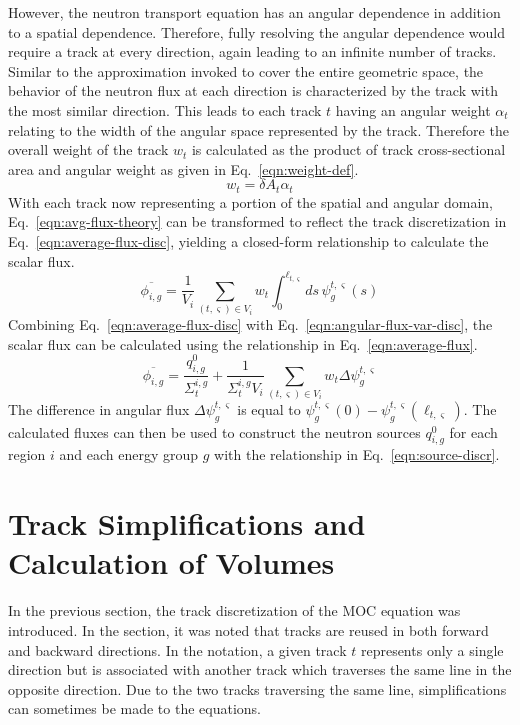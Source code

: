 However, the neutron transport equation has an angular dependence in addition to a spatial dependence. Therefore, fully resolving the angular dependence would require a track at every direction, again leading to an infinite number of tracks. Similar to the approximation invoked to cover the entire geometric space, the behavior of the neutron flux at each direction is characterized by the track with the most similar direction. This leads to each track $t$ having an angular weight $\alpha_t$ relating to the width of the angular space represented by the track. Therefore the overall weight of the track $w_t$ is calculated as the product of track cross-sectional area and angular weight as given in Eq.~\ref{eqn:weight-def}.
\begin{equation}
w_{t} = \delta A_{t} \alpha_t
\label{eqn:weight-def}
\end{equation}
With each track now representing a portion of the spatial and angular domain, Eq.~\ref{eqn:avg-flux-theory} can be transformed to reflect the track discretization in Eq.~\ref{eqn:average-flux-disc}, yielding a closed-form relationship to calculate the scalar flux.
\begin{dmath}
	\overline{\phi_{i,g}} = \frac{1}{V_i} \sum_{(t,\varsigma) \in V_i} w_{t} \int_{0}^{\ell_{t,\varsigma}} ds \, \psi^{t,\varsigma}_g(s)
	\label{eqn:average-flux-disc}
\end{dmath}
Combining Eq.~\ref{eqn:average-flux-disc} with Eq.~\ref{eqn:angular-flux-var-disc}, the scalar flux can be calculated using the relationship in Eq.~\ref{eqn:average-flux}.
\begin{dmath}
	\overline{\phi_{i,g}} = \frac{q^0_{i,g}}{\Sigma_{t}^{i,g}} + \frac{1}{\Sigma_{t}^{i,g} V_i} \sum_{(t,\varsigma) \in V_i} w_{t} \Delta \psi_g^{t,\varsigma}
	\label{eqn:average-flux}
\end{dmath}
The difference in angular flux $\Delta \psi_g^{t,\varsigma}$ is equal to $\psi_g^{t,\varsigma}(0) - \psi_g^{t,\varsigma}(\ell_{t,\varsigma})$. The calculated fluxes can then be used to construct the neutron sources $q^0_{i,g}$ for each region $i$ and each energy group $g$ with the relationship in Eq.~\ref{eqn:source-discr}.

\section{Track Simplifications and Calculation of Volumes}
\label{sec:track-simplifications}

In the previous section, the track discretization of the \ac{MOC} equation was introduced. In the section, it was noted that tracks are reused in both forward and backward directions. In the notation, a given track $t$ represents only a single direction but is associated with another track which traverses the same line in the opposite direction. Due to the two tracks traversing the same line, simplifications can sometimes be made to the equations.

